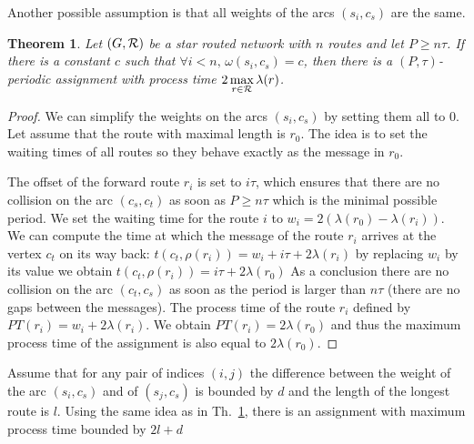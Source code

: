 \documentclass[10pt, conference, letterpaper]{IEEEtran}
\newtheorem{theorem}{Theorem}
\begin{document}
	Another possible assumption is that all weights of the arcs $(s_i,c_s)$ are the same.
	
	 \begin{theorem}\label{th:asym}
	 Let $(G,{\cal R})$ be a star routed network with $n$ routes and let $P \geq n\tau$. If there is a constant $c$ such that $\forall i < n, \,\omega(s_i,c_s) = c$, then there is a $(P,\tau)$-periodic assignment with process time $2\, \displaystyle{\max_{r\in {\cal R}} \lambda(r)}$.
	 \end{theorem}
      \begin{proof}
      
        We can simplify the weights on the arcs $(s_i,c_s)$ by setting them all to $0$.
        Let assume that the route with maximal length is $r_0$. The idea is to 
        set the waiting times of all routes so they behave exactly as the message in $r_0$.
        
        The offset of the forward route $r_i$ is set to $i\tau$, which ensures that there are no collision on the arc $(c_s,c_t)$ as soon as $P \geq n\tau$ which is the minimal possible period. We set the waiting time for the route $i$ to $w_i = 2(\lambda(r_{0}) - \lambda(r_{i}))$. We can compute the time at which the message of the route $r_i$ arrives at the vertex $c_t$ on its way back: $t(c_t,\rho(r_i)) = w_i + i\tau + 2\lambda(r_{i})$
        by replacing $w_i$ by its value we obtain $t(c_t,\rho(r_i)) =  i\tau + 2\lambda(r_{0})$
        As a conclusion there are no collision on the arc $(c_t,c_s)$ as soon as the 
        period is larger than $n\tau$ (there are no gaps between the messages).
        The process time of the route $r_i$ defined by $PT(r_i) = w_i + 2\lambda(r_{i}) $. We obtain $PT(r_i) = 2\lambda(r_{0})$ and thus the maximum process time of the assignment is also equal to $2\lambda(r_0)$.
     \end{proof}
     
     Assume that for any pair of indices $(i,j)$ the difference between the weight of the arc $(s_i,c_s)$ and of $(s_j,c_s)$ is bounded by $d$ and the length of the longest route is $l$. Using the same idea as in Th.~\ref{th:asym}, there is an assignment with maximum process time bounded by  $2l + d$
     
\end{document}
